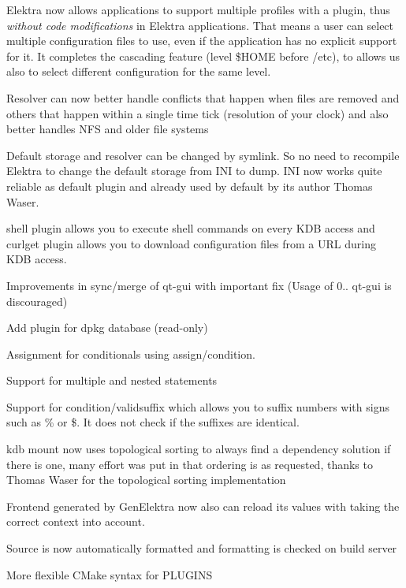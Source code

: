 \begin{DoxyItemize}
\item Elektra now allows applications to support multiple profiles with a plugin, thus {\itshape without code modifications} in Elektra applications. That means a user can select multiple configuration files to use, even if the application has no explicit support for it. It completes the cascading feature (level {\ttfamily \$\+H\+O\+ME} before /etc), to allows us also to select different configuration for the same level.
\item Resolver can now better handle conflicts that happen when files are removed and others that happen within a single time tick (resolution of your clock) and also better handles N\+FS and older file systems
\item Default storage and resolver can be changed by symlink. So no need to recompile Elektra to change the default storage from I\+NI to dump. I\+NI now works quite reliable as default plugin and already used by default by its author Thomas Waser.
\end{DoxyItemize}


\begin{DoxyItemize}
\item shell plugin allows you to execute shell commands on every K\+DB access and curlget plugin allows you to download configuration files from a U\+RL during K\+DB access.
\item Improvements in sync/merge of qt-\/gui with important fix (Usage of 0.. qt-\/gui is discouraged)
\item Add plugin for dpkg database (read-\/only)
\item Assignment for conditionals using {\ttfamily assign/condition}.
\item Support for multiple and nested statements
\item Support for {\ttfamily condition/validsuffix} which allows you to suffix numbers with signs such as {\ttfamily \%} or {\ttfamily \$}. It does not check if the suffixes are identical.
\item kdb mount now uses topological sorting to always find a dependency solution if there is one, many effort was put in that ordering is as requested, thanks to Thomas Waser for the topological sorting implementation
\item Frontend generated by Gen\+Elektra now also can reload its values with taking the correct context into account.
\item Source is now automatically formatted and formatting is checked on build server
\item More flexible C\+Make syntax for P\+L\+U\+G\+I\+NS
\end{DoxyItemize}

